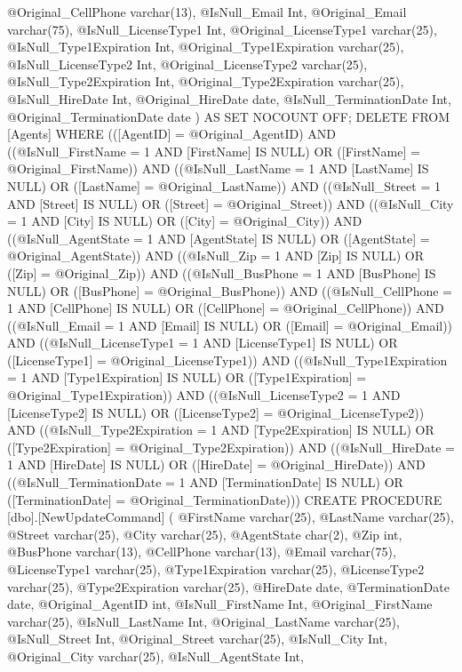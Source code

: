 	@Original_CellPhone varchar(13),
	@IsNull_Email Int,
	@Original_Email varchar(75),
	@IsNull_LicenseType1 Int,
	@Original_LicenseType1 varchar(25),
	@IsNull_Type1Expiration Int,
	@Original_Type1Expiration varchar(25),
	@IsNull_LicenseType2 Int,
	@Original_LicenseType2 varchar(25),
	@IsNull_Type2Expiration Int,
	@Original_Type2Expiration varchar(25),
	@IsNull_HireDate Int,
	@Original_HireDate date,
	@IsNull_TerminationDate Int,
	@Original_TerminationDate date
) AS SET NOCOUNT OFF;
DELETE FROM [Agents] WHERE (([AgentID] = @Original_AgentID) AND ((@IsNull_FirstName = 1 AND [FirstName] IS NULL) OR ([FirstName] = @Original_FirstName)) AND ((@IsNull_LastName = 1 AND [LastName] IS NULL) OR ([LastName] = @Original_LastName)) AND ((@IsNull_Street = 1 AND [Street] IS NULL) OR ([Street] = @Original_Street)) AND ((@IsNull_City = 1 AND [City] IS NULL) OR ([City] = @Original_City)) AND ((@IsNull_AgentState = 1 AND [AgentState] IS NULL) OR ([AgentState] = @Original_AgentState)) AND ((@IsNull_Zip = 1 AND [Zip] IS NULL) OR ([Zip] = @Original_Zip)) AND ((@IsNull_BusPhone = 1 AND [BusPhone] IS NULL) OR ([BusPhone] = @Original_BusPhone)) AND ((@IsNull_CellPhone = 1 AND [CellPhone] IS NULL) OR ([CellPhone] = @Original_CellPhone)) AND ((@IsNull_Email = 1 AND [Email] IS NULL) OR ([Email] = @Original_Email)) AND ((@IsNull_LicenseType1 = 1 AND [LicenseType1] IS NULL) OR ([LicenseType1] = @Original_LicenseType1)) AND ((@IsNull_Type1Expiration = 1 AND [Type1Expiration] IS NULL) OR ([Type1Expiration] = @Original_Type1Expiration)) AND ((@IsNull_LicenseType2 = 1 AND [LicenseType2] IS NULL) OR ([LicenseType2] = @Original_LicenseType2)) AND ((@IsNull_Type2Expiration = 1 AND [Type2Expiration] IS NULL) OR ([Type2Expiration] = @Original_Type2Expiration)) AND ((@IsNull_HireDate = 1 AND [HireDate] IS NULL) OR ([HireDate] = @Original_HireDate)) AND ((@IsNull_TerminationDate = 1 AND [TerminationDate] IS NULL) OR ([TerminationDate] = @Original_TerminationDate)))
CREATE PROCEDURE [dbo].[NewUpdateCommand]
(
	@FirstName varchar(25),
	@LastName varchar(25),
	@Street varchar(25),
	@City varchar(25),
	@AgentState char(2),
	@Zip int,
	@BusPhone varchar(13),
	@CellPhone varchar(13),
	@Email varchar(75),
	@LicenseType1 varchar(25),
	@Type1Expiration varchar(25),
	@LicenseType2 varchar(25),
	@Type2Expiration varchar(25),
	@HireDate date,
	@TerminationDate date,
	@Original_AgentID int,
	@IsNull_FirstName Int,
	@Original_FirstName varchar(25),
	@IsNull_LastName Int,
	@Original_LastName varchar(25),
	@IsNull_Street Int,
	@Original_Street varchar(25),
	@IsNull_City Int,
	@Original_City varchar(25),
	@IsNull_AgentState Int,
